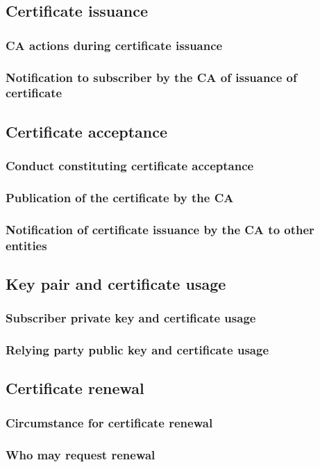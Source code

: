 \documentclass[10pt]{article}
\begin{document}
\subsection{Certificate issuance}
\subsubsection{CA actions during certificate issuance}
\subsubsection{Notification to subscriber by the CA of issuance of certificate}
\subsection{Certificate acceptance}
\subsubsection{Conduct constituting certificate acceptance}
\subsubsection{Publication of the certificate by the CA}
\subsubsection{Notification of certificate issuance by the CA to other entities}
\subsection{Key pair and certificate usage}
\subsubsection{Subscriber private key and certificate usage}
\subsubsection{Relying party public key and certificate usage}
\subsection{Certificate renewal}
\subsubsection{Circumstance for certificate renewal}
\subsubsection{Who may request renewal}
\end{document}

